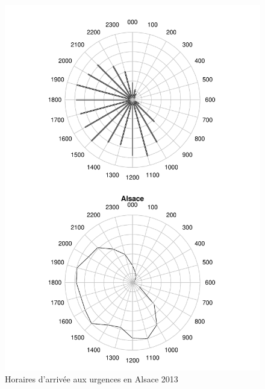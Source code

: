\documentclass[12pt,english,french]{report}\usepackage{graphicx, color}
\makeatletter
\def\maxwidth{ %
  \ifdim\Gin@nat@width>\linewidth
    \linewidth
  \else
    \Gin@nat@width
  \fi
}
\newenvironment{knitrout}{}{} %
\makeatother
\begin{document}
\begin{figure}
\begin{center}
\begin{knitrout}
\color{fgcolor}
\includegraphics[width=\maxwidth]{figure/test25} 

\end{knitrout}

\end{center}
\caption{Horaires d'arrivée aux urgences en Alsace 2013}
\label{radar:als}
\end{figure}
\end{document}
